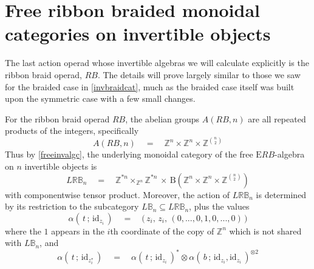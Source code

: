 \documentclass{amsbook} %
\numberwithin{section}{chapter}
\begin{document}
\section{Free ribbon braided monoidal categories on invertible objects}

The last action operad whose invertible algebras we will calculate explicitly is the ribbon braid operad, $RB$. The details will prove largely similar to those we saw for the braided case in \cref{invbraidcat}, much as the braided case itself was built upon the symmetric case with a few small changes. 

\begin{prop} \label{invribboncat} For the ribbon braid operad $RB$, the abelian groups $A(RB,n)$ are all repeated products of the integers, specifically
\[ A(RB,n) \quad = \quad \mathbb{Z}^{n} \times \mathbb{Z}^{n} \times \mathbb{Z}^{{n}\choose{2}} \]
Thus by \cref{freeinvalgc}, the underlying monoidal category of the free $\mathrm{E}RB$-algebra on $n$ invertible objects is
\[ L\mathbb{RB}_n \quad = \quad \mathbb{Z}^{\ast n} \times_{\mathbb{Z}^n} \mathbb{Z}^{\ast n}  \, \times \, \mathrm{B}(\mathbb{Z}^{n} \times \mathbb{Z}^{n} \times \mathbb{Z}^{{n}\choose{2}}) \]
with componentwise tensor product. Moreover, the action of $L\mathbb{RB}_n$ is determined by its restriction to the subcategory $L\mathbb{B}_n \subseteq L\mathbb{RB}_n$, plus the values
\[ \alpha( \, t \, ; \, \mathrm{id}_{z_i} \, ) \quad = \quad \big( \, z_i, \, z_i, \, (0,...,0, 1, 0,...,0) \, \big) \]
where the $1$ appears in the $i$th coordinate of the copy of $\mathbb{Z}^{n}$ which is not shared with $L\mathbb{B}_n$, and
\[ \alpha( \, t \, ; \, \mathrm{id}_{z_i^*} \, ) \quad = \quad \alpha( \, t \, ; \, \mathrm{id}_{z_i} \, )^* \otimes \alpha( \, b \, ; \, \mathrm{id}_{z_i}, \mathrm{id}_{z_i} \, )^{\otimes 2} \]
\end{prop}
\end{document}
